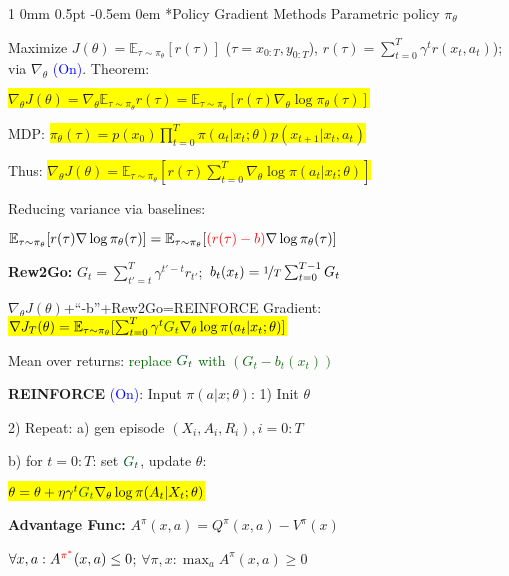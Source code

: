\documentclass[11pt,landscape,a4paper,fleqn]{article}
\makeatletter
\newcommand*{\rsection}{%
	\@startsection{section}%
	{1}%
	{0mm}%
	{0.5pt}%
	{-0.5em \@plus 0em}
	{\color{myorange}\sffamily\small\bfseries}}
\newcommand{\mhl}[1]{\setlength{\fboxsep}{0pt}\colorbox{yellow}{#1}}
\makeatother
\begin{document}
\begin{multicols*}{4}
\rsection*{Policy Gradient Methods} Parametric policy $\pi_\theta$

Maximize $J(\theta) = \mathbb{E}_{\tau \sim \pi_\theta} [r(\tau)]$ ($\tau = x_{0:T}, y_{0:T}$), $r(\tau) = \sum_{t=0}^{T} \gamma^t r(x_t, a_t)$); via $\nabla_\theta$ {\fontsize{9}{6}\selectfont \textcolor{blue}{(On)}}. Theorem:

\mhl{$\nabla_\theta J(\theta) = \nabla_\theta \mathbb{E}_{\tau \sim \pi_\theta} r(\tau) = \mathbb{E}_{\tau \sim \pi_\theta} [r(\tau) \nabla_\theta \log \pi_\theta(\tau)]$}

MDP: \mhl{$\pi_\theta(\tau) = p(x_0) \prod_{t=0}^{T} \pi(a_t | x_t; \theta) p(x_{t+1} | x_t, a_t)$}

Thus: \mhl{$\nabla_\theta J(\theta) = \mathbb{E}_{\tau \sim \pi_\theta} [r(\tau) \sum_{t=0}^{T} \nabla_\theta \log \pi(a_t | x_t; \theta)]$}

Reducing variance via baselines:

\mbox{\fontsize{9.4}{6}\selectfont $\mathbb{E}_{\tau \sim \pi_\theta} [r(\tau) \nabla \log \pi_\theta(\tau)] = \mathbb{E}_{\tau \sim \pi_\theta} [\textcolor{red}{(r(\tau) - b)} \nabla \log \pi_\theta(\tau)]$}

\textbf{Rew2Go:} \mbox{$G_t = \sum_{t' = t}^{T} \gamma^{t' - t} r_{t'}$; $b_t(x_t) = \nicefrac{1}{T} \sum_{t=0}^{T-1} G_t$}


$\nabla_{\theta}J(\theta)$+``-b''+Rew2Go=REINFORCE Gradient:
\mhl{$\nabla J_T(\theta) = \mathbb{E}_{\tau \sim \pi_\theta} [\sum_{t=0}^T \gamma^t \textcolor{darkgreen}{G_t} \nabla_\theta \log \pi(a_t | x_t; \theta)]$}

Mean over returns: \textcolor{darkgreen}{replace $\textcolor{darkgreen}{G_t}$ with $(G_t - b_t(x_t))$}

\textbf{REINFORCE} \textcolor{blue}{(On)}: Input $\pi(a | x; \theta)$: 1) Init $\theta$

2) Repeat: a) gen episode $(X_i, A_i, R_i), i=0:T$ 

b) for $t=0:T$: set $\textcolor{darkgreen}{G_t}$, update $\theta$:

\mhl{$\theta = \theta + \eta \gamma^t \textcolor{darkgreen}{G_t} \nabla_\theta \log \pi(A_t | X_t; \theta)$}




\textbf{Advantage Func:} {\fontsize{9.8}{6}\selectfont $A^\pi(x,a) = Q^\pi(x,a) - V^\pi(x)$}

$\forall x,a: A^{\textcolor{red}{\pi^*}}(x,a) \leq 0$; $\forall \pi,x: \max_a A^\pi(x,a) \geq 0$




\end{multicols*}
\end{document}
